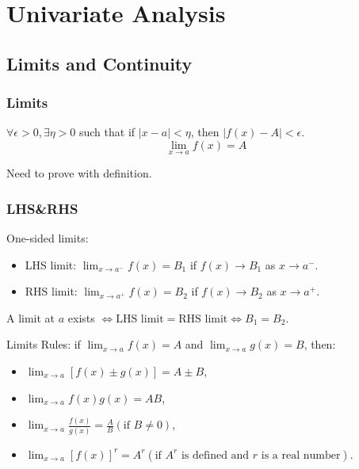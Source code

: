 \section[Univariate Analysis]{Univariate Analysis}

\subsection{Limits and Continuity}

\subsubsection{Limits}

\begin{definition}
    $\forall \epsilon > 0, \exists \eta >0$ such that if $|x - a| < \eta$, then $|f(x) - A| < \epsilon$.
    \begin{equation*}
        \lim_{x \to a} f(x) = A
    \end{equation*}
\end{definition}

\begin{remark*}
    Need to prove with definition.
\end{remark*}


\subsubsection{LHS\&RHS}

\begin{proposition}[$LHS=RHS$]
    One-sided limits:
    \begin{itemize}
        \item LHS limit: $\lim_{x \to a^-} f(x)=B_1$ if $f(x) \to B_1$ as $x \to a^-$.
        \item RHS limit: $\lim_{x \to a^+} f(x)=B_2$ if $f(x) \to B_2$ as $x \to a^+$.
    \end{itemize}

    A limit at $a$ exists $\iff \text{LHS limit} = \text{RHS limit} \iff B_1=B_2$.
\end{proposition}

Limits Rules: if $\lim_{x \to a}f(x)=A $ and $\lim_{x \to a}g(x)=B $, then:
\begin{itemize}
    \item $\lim_{x \to a}[f(x) \pm g(x)] = A \pm B $,
    \item $\lim_{x \to a} f(x)g(x) = AB $,
    \item $\lim_{x \to a}\frac{f(x)}{g(x)} = \frac{A}{B} (\text{if } B \neq 0) $,
    \item $\lim_{x \to a} [f(x)]^r = A^r(\text{if $A^r$ is defined and $r$ is a real number})$.
\end{itemize}


